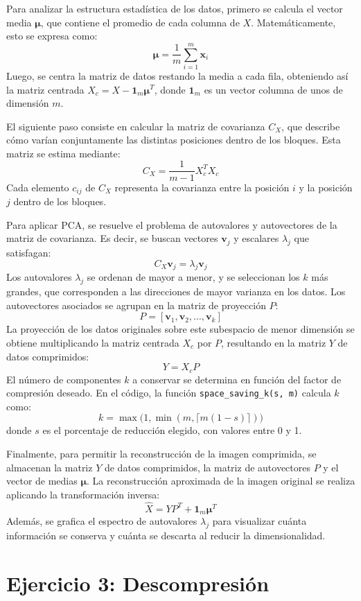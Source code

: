 \documentclass[a4paper,12pt]{article}
\numberwithin{equation}{section}
\numberwithin{figure}{section}
\begin{document}
Para analizar la estructura estadística de los datos, primero se calcula el vector media $\boldsymbol{\mu}$, que contiene el promedio de cada columna de $X$. Matemáticamente, esto se expresa como:
\[
\boldsymbol{\mu} = \frac{1}{m} \sum_{i=1}^m \mathbf{x}_i
\]
Luego, se centra la matriz de datos restando la media a cada fila, obteniendo así la matriz centrada $X_c = X - \mathbf{1}_m \boldsymbol{\mu}^T$, donde $\mathbf{1}_m$ es un vector columna de unos de dimensión $m$.

El siguiente paso consiste en calcular la matriz de covarianza $C_X$, que describe cómo varían conjuntamente las distintas posiciones dentro de los bloques. Esta matriz se estima mediante:
\[
C_X = \frac{1}{m-1} X_c^T X_c
\]
Cada elemento $c_{ij}$ de $C_X$ representa la covarianza entre la posición $i$ y la posición $j$ dentro de los bloques.

Para aplicar PCA, se resuelve el problema de autovalores y autovectores de la matriz de covarianza. Es decir, se buscan vectores $\mathbf{v}_j$ y escalares $\lambda_j$ que satisfagan:
\[
C_X \mathbf{v}_j = \lambda_j \mathbf{v}_j
\]
Los autovalores $\lambda_j$ se ordenan de mayor a menor, y se seleccionan los $k$ más grandes, que corresponden a las direcciones de mayor varianza en los datos. Los autovectores asociados se agrupan en la matriz de proyección $P$:
\[
P = [\mathbf{v}_1, \mathbf{v}_2, \ldots, \mathbf{v}_k]
\]
La proyección de los datos originales sobre este subespacio de menor dimensión se obtiene multiplicando la matriz centrada $X_c$ por $P$, resultando en la matriz $Y$ de datos comprimidos:
\[
Y = X_c P
\]
El número de componentes $k$ a conservar se determina en función del factor de compresión deseado. En el código, la función \texttt{space\_saving\_k(s, m)} calcula $k$ como:
\[
k = \max\big(1, \min(m, \lceil m(1-s) \rceil)\big)
\]
donde $s$ es el porcentaje de reducción elegido, con valores entre 0 y 1.

Finalmente, para permitir la reconstrucción de la imagen comprimida, se almacenan la matriz $Y$ de datos comprimidos, la matriz de autovectores $P$ y el vector de medias $\boldsymbol{\mu}$. La reconstrucción aproximada de la imagen original se realiza aplicando la transformación inversa:
\[
\hat{X} = Y P^T + \mathbf{1}_m \boldsymbol{\mu}^T
\]
Además, se grafica el espectro de autovalores $\lambda_j$ para visualizar cuánta información se conserva y cuánta se descarta al reducir la dimensionalidad.


\section {Ejercicio 3: Descompresión}
\end{document}
